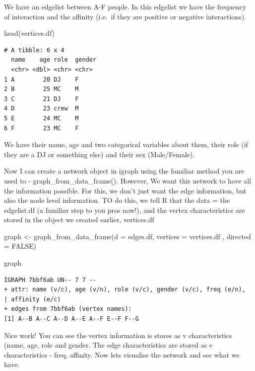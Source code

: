 \documentclass[
  letterpaper,
  DIV=11,
  numbers=noendperiod]{scrreprt}
\newenvironment{Shaded}{\begin{snugshade}}{\end{snugshade}}
\newcommand{\AttributeTok}[1]{\textcolor[rgb]{0.40,0.45,0.13}{#1}}
\newcommand{\ConstantTok}[1]{\textcolor[rgb]{0.56,0.35,0.01}{#1}}
\newcommand{\FunctionTok}[1]{\textcolor[rgb]{0.28,0.35,0.67}{#1}}
\newcommand{\NormalTok}[1]{\textcolor[rgb]{0.00,0.23,0.31}{#1}}
\newcommand{\OtherTok}[1]{\textcolor[rgb]{0.00,0.23,0.31}{#1}}
\begin{document}
We have an edgelist between A-F people. In this edgelist we have the
frequency of interaction and the affinity (i.e.~if they are positive or
negative interactions).

\begin{Shaded}
\begin{Highlighting}[]
\FunctionTok{head}\NormalTok{(vertices.df)}
\end{Highlighting}
\end{Shaded}

\begin{verbatim}
# A tibble: 6 x 4
  name    age role  gender
  <chr> <dbl> <chr> <chr> 
1 A        20 DJ    F     
2 B        25 MC    M     
3 C        21 DJ    F     
4 D        23 crew  M     
5 E        24 MC    M     
6 F        23 MC    F     
\end{verbatim}

We have their name, age and two categorical variables about them, their
role (if they are a DJ or something else) and their sex (Male/Female).

Now I can create a network object in igraph using the familiar method
you are used to - graph\_from\_data\_frame(). However, We want this
network to have all the information possible. For this, we don't just
want the edge information, but also the node level information. TO do
this, we tell R that the data = the edgelist.df (a familiar step to you
pros now!), and the vertex characteristics are stored in the object we
created earlier, vertices.df

\begin{Shaded}
\begin{Highlighting}[]
\NormalTok{graph }\OtherTok{\textless{}{-}} \FunctionTok{graph\_from\_data\_frame}\NormalTok{(}\AttributeTok{d =}\NormalTok{ edges.df, }\AttributeTok{vertices =}\NormalTok{ vertices.df , }\AttributeTok{directed =} \ConstantTok{FALSE}\NormalTok{)}

\NormalTok{graph}
\end{Highlighting}
\end{Shaded}

\begin{verbatim}
IGRAPH 7bbf6ab UN-- 7 7 -- 
+ attr: name (v/c), age (v/n), role (v/c), gender (v/c), freq (e/n),
| affinity (e/c)
+ edges from 7bbf6ab (vertex names):
[1] A--B A--C A--D A--E A--F E--F F--G
\end{verbatim}

Nice work! You can see the vertex information is stores as v
characteristics (name, age, role and gender. The edge characteristics
are stored as e characteristics - freq, affinity. Now lets visualise the
network and see what we have.
\end{document}
